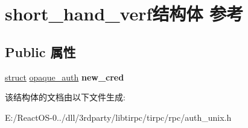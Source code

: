\hypertarget{structshort__hand__verf}{}\section{short\+\_\+hand\+\_\+verf结构体 参考}
\label{structshort__hand__verf}
\subsection*{Public 属性}
\begin{DoxyCompactItemize}
\item 
\mbox{\label{structshort__hand__verf_ac13eabfb5a55465528dbfd96cf3661ad}} 
\hyperlink{interfacestruct}{struct} \hyperlink{structopaque__auth}{opaque\+\_\+auth} {\bfseries new\+\_\+cred}
\end{DoxyCompactItemize}


该结构体的文档由以下文件生成\+:\begin{DoxyCompactItemize}
\item 
E\+:/\+React\+O\+S-\/0../dll/3rdparty/libtirpc/tirpc/rpc/auth\+\_\+unix.\+h\end{DoxyCompactItemize}
